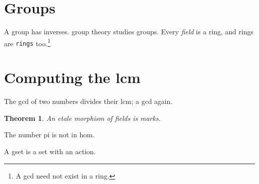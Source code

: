 \documentclass{article}
\newtheorem{theorem}{Theorem}
\begin{document}
\section{Groups}
A \gls{group} has inverses. \Gls{group} theory studies \glspl{group}.
Every \emph{\gls{field}} is a \textsf{\gls{ring}}, and \Glspl{ring} are
\texttt{\glspl{ring}} too.\footnote{A \gls{gcd} need not exist in a
\gls{ring}.}
\section{Computing the \gls{lcm}}
The \gls{gcd} of two numbers divides their \gls{lcm}; a \gls{gcd} again.
\begin{theorem}
An \gls{etale} morphism of \glspl{field} is \gls{marks}.
\end{theorem}
The number \gls{pi} is not in \gls{hom}.

A \gls{gset} is a set with an action.
\printglossary[style=list]
\printglossary[type=\acronymtype,style=long]
\printglossary[type=symbols,style=super]
\printglossary[type=notation,style=index]
\end{document}
